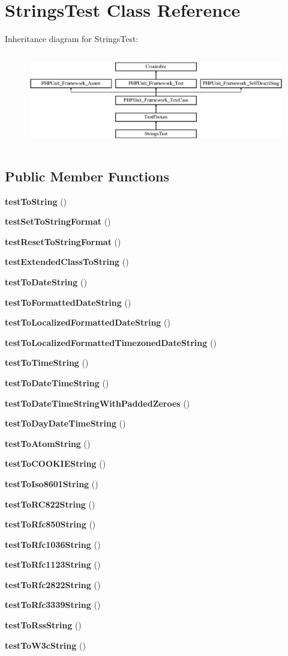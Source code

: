 \section{Strings\+Test Class Reference}
\label{class_strings_test}
Inheritance diagram for Strings\+Test\+:\begin{figure}[H]
\begin{center}
\leavevmode
\includegraphics[height=4.129793cm]{class_strings_test}
\end{center}
\end{figure}
\subsection*{Public Member Functions}
\begin{DoxyCompactItemize}
\item 
{\bf test\+To\+String} ()
\item 
{\bf test\+Set\+To\+String\+Format} ()
\item 
{\bf test\+Reset\+To\+String\+Format} ()
\item 
{\bf test\+Extended\+Class\+To\+String} ()
\item 
{\bf test\+To\+Date\+String} ()
\item 
{\bf test\+To\+Formatted\+Date\+String} ()
\item 
{\bf test\+To\+Localized\+Formatted\+Date\+String} ()
\item 
{\bf test\+To\+Localized\+Formatted\+Timezoned\+Date\+String} ()
\item 
{\bf test\+To\+Time\+String} ()
\item 
{\bf test\+To\+Date\+Time\+String} ()
\item 
{\bf test\+To\+Date\+Time\+String\+With\+Padded\+Zeroes} ()
\item 
{\bf test\+To\+Day\+Date\+Time\+String} ()
\item 
{\bf test\+To\+Atom\+String} ()
\item 
{\bf test\+To\+C\+O\+O\+K\+I\+E\+String} ()
\item 
{\bf test\+To\+Iso8601\+String} ()
\item 
{\bf test\+To\+R\+C822\+String} ()
\item 
{\bf test\+To\+Rfc850\+String} ()
\item 
{\bf test\+To\+Rfc1036\+String} ()
\item 
{\bf test\+To\+Rfc1123\+String} ()
\item 
{\bf test\+To\+Rfc2822\+String} ()
\item 
{\bf test\+To\+Rfc3339\+String} ()
\item 
{\bf test\+To\+Rss\+String} ()
\item 
{\bf test\+To\+W3c\+String} ()
\end{DoxyCompactItemize}
